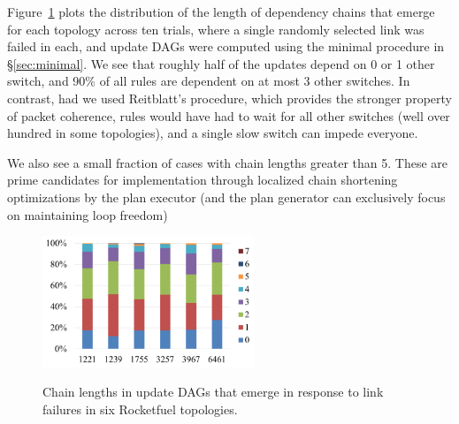 Figure~\ref{fig:as} plots the distribution of the length of dependency chains that emerge for each topology across ten trials, where a single randomly selected link was failed in each, and update DAGs were computed using the minimal procedure in \S\ref{sec:minimal}. We see that roughly half of the updates depend on 0 or 1 other switch, and 90\% of all rules are dependent on at most 3 other switches. In contrast, had we used Reitblatt's procedure, which provides the stronger property of packet coherence, rules would have had to wait for all other switches (well over hundred in some topologies), and a single slow switch can impede everyone.

We also see a small fraction of cases with chain lengths greater than 5. These are prime candidates for implementation through localized chain shortening optimizations by the plan executor (and the plan generator can exclusively focus on maintaining loop freedom) 


\begin{figure}[t!]
  \centering
  \includegraphics[width=2.5in]{figures/as.png}\\
  \caption{Chain lengths in update DAGs that emerge in response to link failures in six Rocketfuel topologies.}\label{fig:as}
\end{figure}

